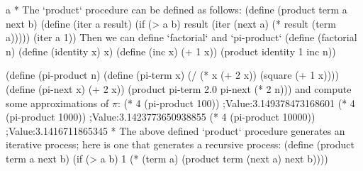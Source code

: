 \begitems\novspaces\style a
* The `product` procedure can be defined as follows:
\begtt\scm
(define (product term a next b)
  (define (iter a result)
    (if (> a b)
        result
        (iter (next a) (* result (term a)))))
  (iter a 1))
\endtt
Then we can define `factorial` and `pi-product`
\begtt\scm
(define (factorial n)
  (define (identity x) x)
  (define (inc x) (+ 1 x))
  (product identity 1 inc n))

(define (pi-product n)
  (define (pi-term x)
    (/ (* x (+ 2 x))
       (square (+ 1 x))))
  (define (pi-next x)
    (+ 2 x))
  (product pi-term 2.0 pi-next (* 2 n)))
\endtt
and compute some approximations of $\pi$:
\begtt\scm
(* 4 (pi-product 100))
;Value:3.149378473168601
(* 4 (pi-product 1000))
;Value:3.1423773650938855
(* 4 (pi-product 10000))
;Value:3.1416711865345
\endtt
* The above defined `product` procedure generates an iterative process;  here is one that generates a recursive process:
\begtt\scm
(define (product term a next b)
  (if (> a b)
      1
      (* (term a)
         (product term (next a) next b))))
\endtt
\enditems
